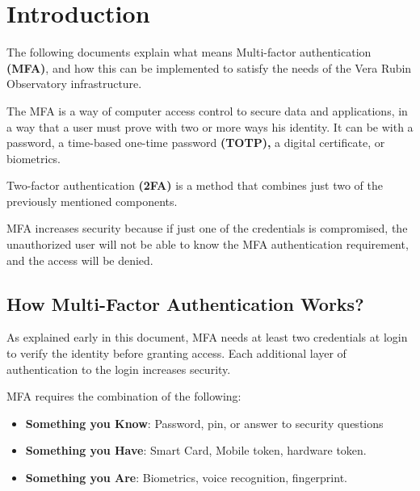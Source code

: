 \section{Introduction}



The following documents explain what means Multi-factor authentication \textbf{(MFA)},  
and how this can be implemented to satisfy the needs of the Vera Rubin Observatory infrastructure.

The MFA is a way of computer access control to secure data and applications,  in a way that a user must prove with two or more ways his identity. 
It can be with a password, a time-based one-time password\textbf{ (TOTP),} a digital certificate, or biometrics.

 Two-factor authentication \textbf{(2FA)} is a method that combines just two of the previously mentioned components.

MFA increases security because if just one of the credentials is compromised, the unauthorized user will not be able to know the MFA authentication requirement, and the access will be denied.


\subsection{How Multi-Factor Authentication Works?
}
As explained early in this document, MFA needs at least two credentials at login to verify the identity before granting access. Each additional layer of authentication to the login increases security.

MFA requires the combination of the following:


\begin{itemize}
\item \textbf{Something you Know}: Password, pin, or answer to security questions
\item \textbf{Something you Have}: Smart Card, Mobile token, hardware token.
\item \textbf{Something you Are}: Biometrics, voice recognition, fingerprint.
\end{itemize}




